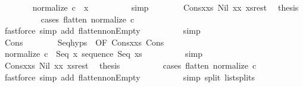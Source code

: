 \begin{isabellebody}
\ \ \ \ \ \ \isamarkupfalse%
\ {\isachardoublequoteopen}normalize\ c{}\ {\isacharequal}\ x{}{\isachardoublequoteclose}\isanewline
\ \ \ \ \ \ \ \ \isamarkupfalse%
\ simp\isanewline
\ \ \ \ \ \ \isamarkupfalse%
\ Cons{\isacharunderscore}x{}{\isacharunderscore}xs{}\ Nil\ x{\isacharunderscore}x{}\ xs{\isacharunderscore}rest\ \isamarkupfalse%
\ {\isacharquery}thesis\isanewline
\ \ \ \ \ \ \ \ \isamarkupfalse%
\ {\isacharparenleft}cases\ {\isachardoublequoteopen}flatten\ {\isacharparenleft}normalize\ c{}{\isacharparenright}{\isachardoublequoteclose}{\isacharparenright}\isanewline
\ \ \ \ \ \ \ \ \isamarkupfalse%
\ {\isacharparenleft}fastforce\ simp\ add{\isacharcolon}\ flatten{\isacharunderscore}nonEmpty{\isacharparenright}\isanewline
\ \ \ \ \ \ \ \ \isamarkupfalse%
\ simp\isanewline
\ \ \ \ \ \ \ \ \isamarkupfalse%
\isanewline
\ \ \ \ \isamarkupfalse%
\isanewline
\ \ \ \ \ \ \isamarkupfalse%
\ Cons\isanewline
\ \ \ \ \ \ \isamarkupfalse%
\ Seq{\isachardot}hyps\ {\isacharparenleft}{}{\isacharparenright}\ {\isacharbrackleft}OF\ Cons{\isacharunderscore}x{}{\isacharunderscore}xs{}{\isacharbrackright}\ Cons\isanewline
\ \ \ \ \ \ \isamarkupfalse%
\ {\isachardoublequoteopen}normalize\ c{}\ {\isacharequal}\ Seq\ x{}\ {\isacharparenleft}sequence\ Seq\ xs{}{\isacharparenright}{\isachardoublequoteclose}\isanewline
\ \ \ \ \ \ \ \ \isamarkupfalse%
\ simp\isanewline
\ \ \ \ \ \ \isamarkupfalse%
\ Cons{\isacharunderscore}x{}{\isacharunderscore}xs{}\ Nil\ x{\isacharunderscore}x{}\ xs{\isacharunderscore}rest\ \isamarkupfalse%
\ {\isacharquery}thesis\isanewline
\ \ \ \ \ \ \ \ \isamarkupfalse%
\ {\isacharparenleft}cases\ {\isachardoublequoteopen}flatten\ {\isacharparenleft}normalize\ c{}{\isacharparenright}{\isachardoublequoteclose}{\isacharparenright}\isanewline
\ \ \ \ \ \ \ \ \isamarkupfalse%
\ {\isacharparenleft}fastforce\ simp\ add{\isacharcolon}\ flatten{\isacharunderscore}nonEmpty{\isacharparenright}\isanewline
\ \ \ \ \ \ \ \ \isamarkupfalse%
\ {\isacharparenleft}simp\ split{\isacharcolon}\ list{\isachardot}splits{\isacharparenright}\isanewline
\ \ \ \ \ \ \ \ \isamarkupfalse%

\end{isabellebody}
